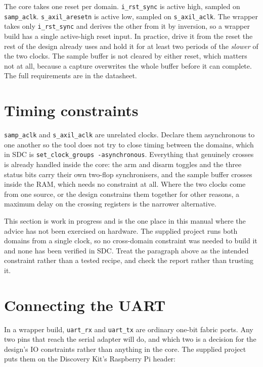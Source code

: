 \documentclass[../manual.tex]{subfiles}
\begin{document}
The core takes one reset per domain. \texttt{i\_rst\_sync} is active high, sampled on \texttt{samp\_aclk}. \texttt{s\_axil\_aresetn} is active low, sampled on \texttt{s\_axil\_aclk}. The wrapper takes only \texttt{i\_rst\_sync} and derives the other from it by inversion, so a wrapper build has a single active-high reset input. In practice, drive it from the reset the rest of the design already uses and hold it for at least two periods of the \emph{slower} of the two clocks. The sample buffer is not cleared by either reset, which matters not at all, because a capture overwrites the whole buffer before it can complete. The full requirements are in the datasheet.

\section{Timing constraints}
\label{sec:integ_sdc}

\texttt{samp\_aclk} and \texttt{s\_axil\_aclk} are unrelated clocks. Declare them asynchronous to one another so the tool does not try to close timing between the domains, which in \acs{SDC} is \texttt{set\_clock\_groups -asynchronous}. Everything that genuinely crosses is already handled inside the core: the arm and disarm toggles and the three status bits carry their own two-flop synchronisers, and the sample buffer crosses inside the RAM, which needs no constraint at all. Where the two clocks come from one source, or the design constrains them together for other reasons, a maximum delay on the crossing registers is the narrower alternative.

This section is work in progress and is the one place in this manual where the advice has not been exercised on hardware. The supplied project runs both domains from a single clock, so no cross-domain constraint was needed to build it and none has been verified in \acs{SDC}. Treat the paragraph above as the intended constraint rather than a tested recipe, and check the report rather than trusting it.

\section{Connecting the UART}
\label{sec:integ_uart}

In a wrapper build, \texttt{uart\_rx} and \texttt{uart\_tx} are ordinary one-bit fabric ports. Any two pins that reach the serial adapter will do, and which two is a decision for the design's IO constraints rather than anything in the core. The supplied project puts them on the Discovery Kit's Raspberry Pi header:
\end{document}
